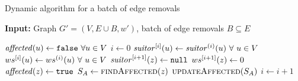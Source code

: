 \begin{algorithm}[t]
\caption{Dynamic \suitor algorithm for a batch of edge removals}
\label{algo:dyn-suitor-batch-rem}
\textbf{Input:} Graph $G' = (V, E \cup B, w')$, batch of edge removals $B \subseteq E$

\begin{algorithmic}[1]
\State$\mathit{affected}(u) \gets \texttt{false}\ \forall u \in V$
\State$i \gets 0$
\State$\vsuitor\iteri(u) \gets \vsuitor\interm(u)\ \forall\ u \in V$
\State$ws^{[i]}(u) \gets ws^{(i)}(u)\ \forall\ u \in V$
\label{line:dyn-suitor-batch-rem:for-rem}
\label{line:dyn-suitor-batch-rem:if}
\State$\mathit{suitor}^{[i + 1]}(z) \gets \texttt{null}$\label{line:dyn-suitor-batch-rem:upd-1}
\State$ws^{[i + 1]}(z) \gets 0$
\State$\mathit{affected}(z) \gets \texttt{true}$
\State$S_A \gets \textsc{findAffected}(z)$\label{line:dyn-suitor-batch-rem:update-aff}
\State$\textsc{updateAffected}(S_A)$\label{line:dyn-suitor-batch-rem:upd-2}
\EndIf
\EndFor
\State$i \gets i + 1$
\EndFor
\end{algorithmic}
\end{algorithm}
